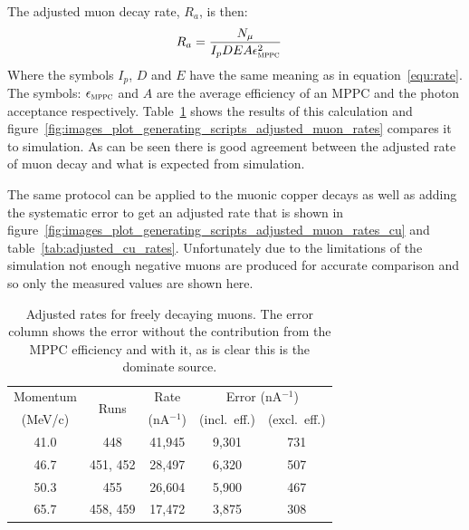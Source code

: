 The adjusted muon decay rate, \( R_a \), is then:
\begin{align}
    R_a &= \frac{N_{\mu}}{I_p D E A \epsilon_{\textsc{mppc}}^2 } \label{equ:adj_rate}
\end{align}
Where the symbols \(I_p\), \(D\) and \(E\) have the same meaning as in equation~\eqref{equ:rate}. The symbols:  \(\epsilon_{\textsc{mppc}}\) and \( A \) are the average efficiency of an MPPC and the photon acceptance respectively. Table~\ref{tab:adjusted_free_decay_rates} shows the results of this calculation and figure~\ref{fig:images_plot_generating_scripts_adjusted_muon_rates} compares it to simulation. As can be seen there is good agreement between the adjusted rate of muon decay and what is expected from simulation.

The same protocol can be applied to the muonic copper decays as well as adding the systematic error to get an adjusted rate that is shown in figure~\ref{fig:images_plot_generating_scripts_adjusted_muon_rates_cu} and table~\ref{tab:adjusted_cu_rates}. Unfortunately due to the limitations of the simulation not enough negative muons are produced for accurate comparison and so only the measured values are shown here.

\begin{table}
  \begin{center}
  \begin{tabular}{c | c | c | c | c}
    Momentum  & \multirow{2}{*}{Runs}  &  Rate           &  \multicolumn{2}{c}{Error (nA\(^{-1}\))} \\
     (MeV/c)  &                        &  (nA\(^{-1}\))  &     (incl.\ eff.)  &  (excl.\ eff.)      \\
    \hline
    41.0  &       448  &  41,945  &  9,301  &  731  \\
    46.7  &  451, 452  &  28,497  &  6,320  &  507  \\
    50.3  &       455  &  26,604  &  5,900  &  467  \\
    65.7  &  458, 459  &  17,472  &  3,875  &  308  \\
  \end{tabular}
  \end{center}
  \caption{Adjusted rates for freely decaying muons. The error column shows the error without the contribution from the MPPC efficiency and with it, as is clear this is the dominate source.}
  \label{tab:adjusted_free_decay_rates}
\end{table}

